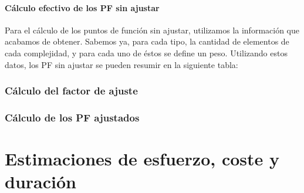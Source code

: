 \documentclass[spanish,a4paper,12pt]{report}	%
\begin{document}
	\subsection{Cálculo efectivo de los PF sin ajustar}
	Para el cálculo de los puntos de función sin ajustar, utilizamos la información que acabamos de obtener. Sabemos ya, para cada tipo, la cantidad de elementos de cada complejidad, y para cada uno de éstos se define un peso. Utilizando estos datos, los PF sin ajustar se pueden resumir en la siguiente tabla: 

\vspace{0.35cm}

\section{Cálculo del factor de ajuste}


\section{Cálculo de los PF ajustados}


\newpage
\mbox{}
\thispagestyle{empty}						%
\newpage
\setcounter{section}{0}

\part{Estimaciones de esfuerzo, coste y duración} %


\newpage
\mbox{}
\thispagestyle{empty}						%
\newpage
\end{document}
